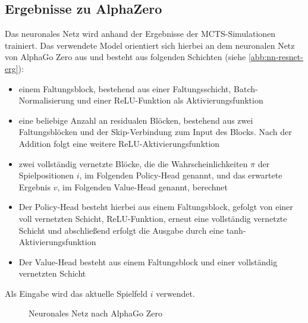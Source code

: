 \documentclass[12pt,a4paper,bibliography=totocnumbered,listof=totocnumbered]{article}
\begin{document}
\subsection{Ergebnisse zu AlphaZero}
Das neuronales Netz wird anhand der Ergebnisse der MCTS-Simulationen trainiert. Das verwendete Model orientiert sich hierbei an dem neuronalen Netz von AlphaGo Zero aus \cite{Silver.2017} und besteht aus folgenden Schichten (siehe \autoref{abb:nn-resnet-erg}):
\begin{itemize}
\item einem Faltungsblock, bestehend aus  einer Faltungsschicht, Batch-Normalisierung und einer ReLU-Funktion als Aktivierungsfunktion
\item eine beliebige Anzahl an residualen Blöcken, bestehend aus zwei Faltungsblöcken und der Skip-Verbindung zum Input des Blocks. Nach der Addition folgt eine weitere ReLU-Aktivierungsfunktion
\item zwei vollständig vernetzte Blöcke, die die Wahrscheinlichkeiten $\pi$ der Spielpositionen $i$, im Folgenden Policy-Head genannt, und das erwartete Ergebnis $v$, im Folgenden Value-Head genannt, berechnet
\item Der Policy-Head besteht hierbei aus einem Faltungsblock, gefolgt von einer voll vernetzten Schicht, ReLU-Funktion, erneut eine vollständig vernetzte Schicht und abschließend erfolgt die Ausgabe durch eine tanh-Aktivierungsfunktion
\item Der Value-Head besteht aus einem Faltungsblock und einer vollständig vernetzten Schicht
\end{itemize}
Als Eingabe wird das aktuelle Spielfeld $i$ verwendet.

\begin{figure}[h]
\centering
{}
\caption{Neuronales Netz nach AlphaGo Zero}
\label{abb:nn-resnet-erg}
\end{figure}
\end{document}
